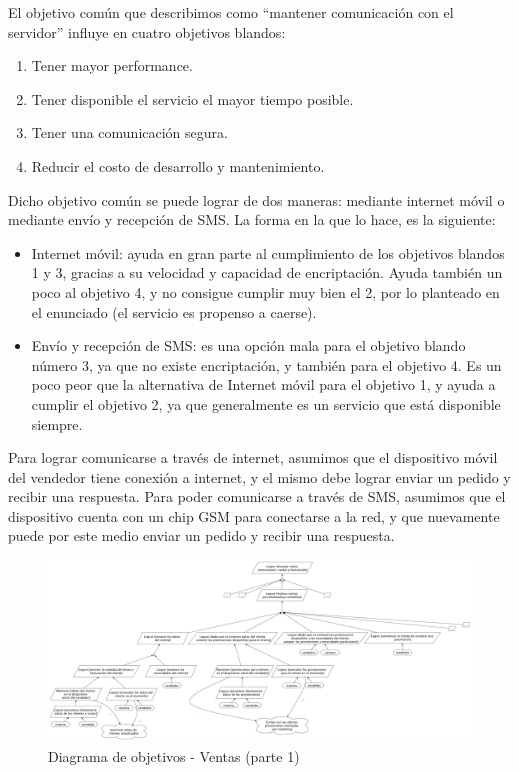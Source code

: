 \indent El objetivo común que describimos como ``mantener comunicación con el servidor'' influye en cuatro objetivos blandos:
\begin{enumerate}
  \item Tener mayor performance.
  \item Tener disponible el servicio el mayor tiempo posible.
  \item Tener una comunicación segura.
  \item Reducir el costo de desarrollo y mantenimiento.
\end{enumerate}

Dicho objetivo común se puede lograr de dos maneras: mediante internet móvil o mediante envío y recepción de SMS. La forma en la que lo hace, es la siguiente:
\begin{itemize}
  \item Internet móvil: ayuda en gran parte al cumplimiento de los objetivos blandos 1 y 3, gracias a su velocidad y capacidad de encriptación. Ayuda también un poco al objetivo 4, y no consigue cumplir muy bien el 2, por lo planteado en el enunciado (el servicio es propenso a caerse).

  \item Envío y recepción de SMS: es una opción mala para el objetivo blando número 3, ya que no existe encriptación, y también para el objetivo 4. Es un poco peor que la alternativa de Internet móvil para el objetivo 1, y ayuda a cumplir el objetivo 2, ya que generalmente es un servicio que está disponible siempre.
\end{itemize}

\indent Para lograr comunicarse a través de internet, asumimos que el dispositivo móvil del vendedor tiene conexión a internet, y el mismo debe lograr enviar un pedido y recibir una respuesta. Para poder comunicarse a través de SMS, asumimos que el dispositivo cuenta con un chip GSM para conectarse a la red, y que nuevamente puede por este medio enviar un pedido y recibir una respuesta.

\begin{figure}[h!]
  \centering
  \includegraphics[width=1.5\textwidth, angle=90]{./imagenes/ventas_1.pdf}
  \caption{Diagrama de objetivos - Ventas (parte 1)}
\end{figure}


